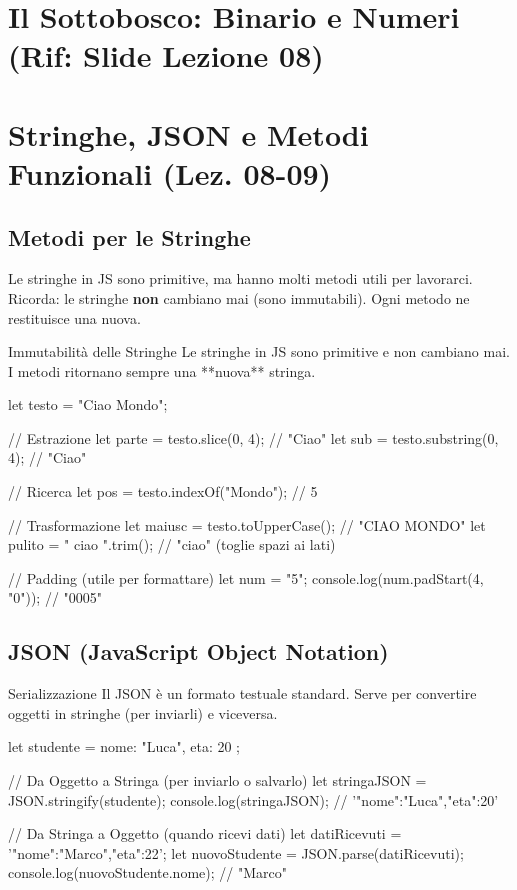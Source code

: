 \section{Il Sottobosco: Binario e Numeri (Rif: Slide Lezione 08)}

\section{Stringhe, JSON e Metodi Funzionali (Lez. 08-09)}

\subsection{Metodi per le Stringhe}
Le stringhe in JS sono primitive, ma hanno molti metodi utili per lavorarci.
Ricorda: le stringhe \textbf{non} cambiano mai (sono immutabili). Ogni metodo ne restituisce una nuova.

\begin{concept}{Immutabilità delle Stringhe}
Le stringhe in JS sono primitive e non cambiano mai. I metodi ritornano sempre una **nuova** stringa.
\end{concept}
\begin{jsbox}
let testo = "Ciao Mondo";

// Estrazione
let parte = testo.slice(0, 4); // "Ciao"
let sub = testo.substring(0, 4); // "Ciao"

// Ricerca
let pos = testo.indexOf("Mondo"); // 5

// Trasformazione
let maiusc = testo.toUpperCase(); // "CIAO MONDO"
let pulito = "  ciao  ".trim(); // "ciao" (toglie spazi ai lati)

// Padding (utile per formattare)
let num = "5";
console.log(num.padStart(4, "0")); // "0005"
\end{jsbox}

\subsection{JSON (JavaScript Object Notation)}
\begin{concept}{Serializzazione}
Il JSON è un formato testuale standard. Serve per convertire oggetti in stringhe (per inviarli) e viceversa.
\end{concept}
\begin{jsbox}
let studente = { nome: "Luca", eta: 20 };

// Da Oggetto a Stringa (per inviarlo o salvarlo)
let stringaJSON = JSON.stringify(studente);
console.log(stringaJSON); // '{"nome":"Luca","eta":20}'

// Da Stringa a Oggetto (quando ricevi dati)
let datiRicevuti = '{"nome":"Marco","eta":22}';
let nuovoStudente = JSON.parse(datiRicevuti);
console.log(nuovoStudente.nome); // "Marco"
\end{jsbox}


